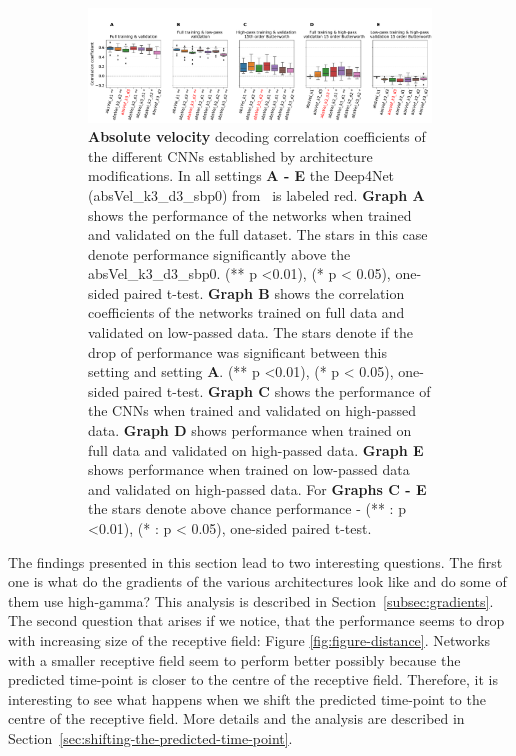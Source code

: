 \begin{itemize}
\begin{figure}[!htpb]
\begin{subfigure}[b]{\textwidth}
   \includegraphics[width=1\linewidth]{img/ch4/original_setting_absVel_performance_comparison}
   \caption{\textbf{Absolute velocity} decoding correlation coefficients of the different CNNs established by architecture modifications. In all settings \textbf{
   A - E} the Deep4Net (absVel\_k3\_d3\_sbp0) from~\cite{Hammer-2021} is labeled red. \textbf{Graph A} shows the performance of the networks when trained and validated on the full dataset. The stars in this case denote performance significantly above the absVel\_k3\_d3\_sbp0. (** p <0.01), (* p < 0.05), one-sided paired t-test.
   \textbf{Graph B} shows the correlation coefficients of the networks trained on full data and validated on low-passed data. 
   The stars denote if the drop of performance was significant between this setting and setting \textbf{A}. (** p <0.01), (* p < 0.05), one-sided paired t-test.
   \textbf{Graph C} shows the performance of the CNNs when trained and validated on high-passed data. \textbf{Graph D} shows performance when trained on full data and validated on high-passed data. \textbf{Graph E} shows performance when trained on low-passed data and validated on high-passed data. For \textbf{Graphs C - E} the stars denote above chance performance - (** : p <0.01), (* : p < 0.05), one-sided paired t-test.}
   \label{fig:original-performances-absolute-velocity}
\end{subfigure}
\caption[]{}
\label{fig:original-performances}
\end{figure}


\end{itemize}

The findings presented in this section lead to two interesting questions.
The first one  is what do the gradients of the various architectures look like and do some of them use high-gamma?
This analysis is described in Section~\ref{subsec:gradients}.
The second question that arises if we notice, that the performance seems to drop with increasing size of the receptive field: Figure \ref{fig:figure-distance}.
Networks with a smaller receptive field seem to perform better possibly because the predicted time-point is closer to the centre of the receptive field.
Therefore, it is interesting to see what happens when we shift the predicted time-point to the centre of the receptive field.
More details and the analysis are described in Section~\ref{sec:shifting-the-predicted-time-point}.

